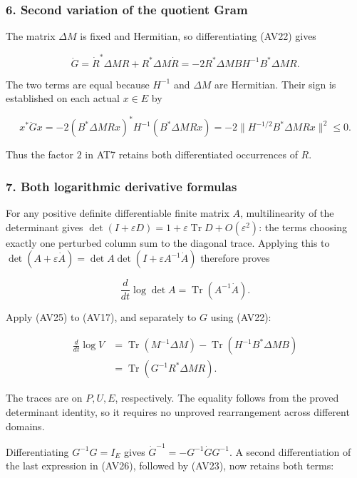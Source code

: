 \subsubsection{6. Second variation of the quotient Gram}\label{endpoint-variation_review--second-variation-of-the-quotient-gram}

The matrix \(\Delta M\) is fixed and Hermitian, so differentiating (AV22) gives

\[
\ddot G=\dot R^*\Delta M R+R^*\Delta M\dot R
=-2R^*\Delta M BH^{-1}B^*\Delta M R.
\tag{AV23}
\]

The two terms are equal because \(H^{-1}\) and \(\Delta M\) are Hermitian. Their sign is established on each actual \(x\in E\) by

\[
x^*\ddot Gx
=-2(B^*\Delta M Rx)^*H^{-1}(B^*\Delta M Rx)
=-2\|H^{-1/2}B^*\Delta M Rx\|^2\le0.
\tag{AV24}
\]

Thus the factor \(2\) in AT7 retains both differentiated occurrences of \(R\).

\subsubsection{7. Both logarithmic derivative formulas}\label{endpoint-variation_review--both-logarithmic-derivative-formulas}

For any positive definite differentiable finite matrix \(A\), multilinearity of the determinant gives \(\det(I+\varepsilon D)=1+\varepsilon\operatorname{Tr}D+O(\varepsilon^2)\): the terms choosing exactly one perturbed column sum to the diagonal trace. Applying this to \(\det(A+\varepsilon\dot A)=\det A\det(I+\varepsilon A^{-1}\dot A)\) therefore proves

\[
\frac{d}{dt}\log\det A=\operatorname{Tr}(A^{-1}\dot A).
\tag{AV25}
\]

Apply (AV25) to (AV17), and separately to \(G\) using (AV22):

\[
\begin{aligned}
\frac{d}{dt}\log V
&=\operatorname{Tr}(M^{-1}\Delta M)
-\operatorname{Tr}(H^{-1}B^*\Delta M B)\\
&=\operatorname{Tr}(G^{-1}R^*\Delta M R).
\end{aligned}
\tag{AV26}
\]

The traces are on \(P,U,E\), respectively. The equality follows from the proved determinant identity, so it requires no unproved rearrangement across different domains.

Differentiating \(G^{-1}G=I_E\) gives \(\dot G^{-1}=-G^{-1}\dot G G^{-1}\). A second differentiation of the last expression in (AV26), followed by (AV23), now retains both terms:

